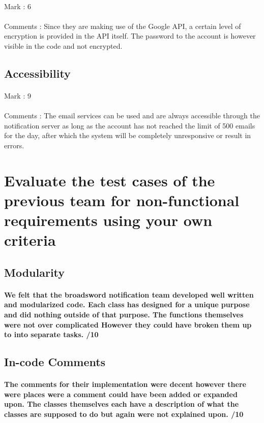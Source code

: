 \documentclass[11pt]{article}
\begin{document}
\paragraph{} Mark : 6
\paragraph{} Comments : Since they are making use of the Google API, a certain level of encryption is provided in the API itself. The password to the account is however visible in the code and not encrypted. 

\subsection{Accessibility}
\paragraph{} Mark : 9
\paragraph{} Comments : The email services can be used and are always accessible through the notification server as long as the account has not reached the limit of 500 emails for the day, after which the system will be completely unresponsive or result in errors.

\section{Evaluate the test cases of the previous team for non-functional requirements using your own criteria}	
		\subsection{Modularity}
			\paragraph{We felt that the broadsword notification team developed well written and modularized code. Each class has designed for a unique purpose and did nothing outside of that purpose. The functions themselves were not over complicated However they could have broken them up to into separate tasks.  /10}
		\subsection{In-code Comments}
			\paragraph{The comments for their implementation were decent however there were places were a comment could have been added or expanded upon. The classes themselves each have a description of what the classes are supposed to do but again were not explained upon. /10}
\end{document}

